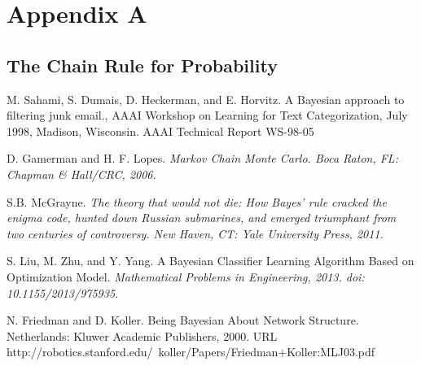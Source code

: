 \documentclass[12pt,twoside]{reedthesis}
\begin{document}
    \appendix
      \chapter{Appendix A}
      \section{The Chain Rule for Probability}



  \backmatter %

\newpage
\begin{thebibliography}{1}

 M. Sahami, S. Dumais, D. Heckerman, and E. Horvitz. A Bayesian approach to filtering junk email., AAAI Workshop on Learning for Text Categorization, July 1998, Madison, Wisconsin. AAAI Technical Report WS-98-05

 D. Gamerman and H. F. Lopes. \em{Markov Chain Monte Carlo}. Boca Raton, FL: Chapman \& Hall/CRC, 2006.

 S.B. McGrayne. \em{The theory that would not die: How Bayes' rule cracked the enigma code, hunted down Russian submarines, and emerged triumphant from two centuries of controversy}. New Haven, CT: Yale University Press, 2011.

 S. Liu, M. Zhu, and Y. Yang. A Bayesian Classifier Learning Algorithm Based on Optimization Model. \em{Mathematical Problems in Engineering}, {2013}. doi: 10.1155/2013/975935. %

 N. Friedman and D. Koller. Being Bayesian About Network Structure. Netherlands: Kluwer Academic Publishers, 2000. URL http://robotics.stanford.edu/~koller/Papers/Friedman+Koller:MLJ03.pdf

\end{thebibliography}


%  

\end{document}
